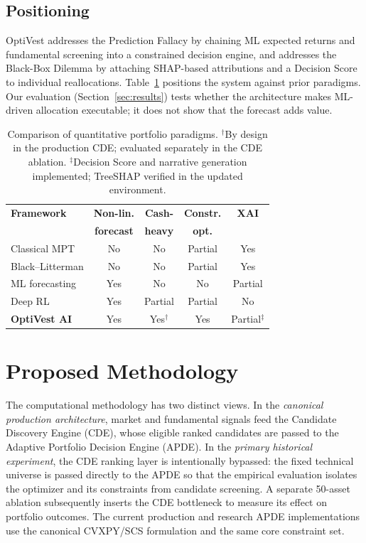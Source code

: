\documentclass[conference]{IEEEtran}
\begin{document}
\subsection{Positioning}
OptiVest addresses the Prediction Fallacy by chaining ML expected
returns and fundamental screening into a constrained decision engine,
and addresses the Black-Box Dilemma by attaching SHAP-based
attributions and a Decision Score to individual reallocations.
Table~\ref{tab:paradigms} positions the system against prior
paradigms. Our evaluation (Section~\ref{sec:results}) tests whether the
architecture makes ML-driven allocation executable; it does not show
that the forecast adds value.

\begin{table}[t]
\caption{Comparison of quantitative portfolio paradigms.
$^\dagger$By design in the production CDE; evaluated separately in
the CDE ablation. $^\ddagger$Decision Score and narrative generation
implemented; TreeSHAP verified in the updated environment.}
\label{tab:paradigms}
\centering
\setlength{\tabcolsep}{3pt}
\renewcommand{\arraystretch}{1.15}
\begin{tabular}{@{}p{2.1cm}cccc@{}}
\toprule
\textbf{Framework} & \textbf{Non-lin.} & \textbf{Cash-} & \textbf{Constr.} & \textbf{XAI} \\
 & \textbf{forecast} & \textbf{heavy} & \textbf{opt.} & \\
\midrule
Classical MPT \cite{markowitz1952} & No & No & Partial & Yes \\
Black--Litterman \cite{blacklitterman1992} & No & No & Partial & Yes \\
ML forecasting \cite{gu2020} & Yes & No & No & Partial \\
Deep RL \cite{jiang2017} & Yes & Partial & Partial & No \\
\textbf{OptiVest AI} & Yes & Yes$^\dagger$ & Yes & Partial$^\ddagger$ \\
\bottomrule
\end{tabular}
\end{table}

\section{Proposed Methodology}
\label{sec:method}

The computational methodology has two distinct views. In the
\emph{canonical production architecture}, market and fundamental
signals feed the Candidate Discovery Engine (CDE), whose eligible
ranked candidates are passed to the Adaptive Portfolio Decision Engine
(APDE). In the \emph{primary historical experiment}, the CDE ranking
layer is intentionally bypassed: the fixed technical universe is
passed directly to the APDE so that the empirical evaluation isolates
the optimizer and its constraints from candidate screening. A separate
50-asset ablation subsequently inserts the CDE bottleneck to measure
its effect on portfolio outcomes. The current production and research
APDE implementations use the canonical CVXPY/SCS formulation and the
same core constraint set.
\end{document}
